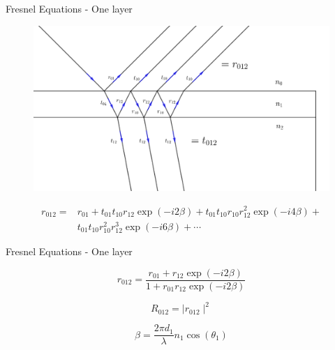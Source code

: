 \documentclass[10pt]{beamer}
\begin{document}
	\begin{frame}{Fresnel Equations - One layer}
	
	\begin{figure} 
		 \begin{center}
		   \includegraphics[width=\textwidth]{figreflre.png}
		 \end{center}
	\end{figure}
	\begin{align*}
	r_{012} = &r_{01} + t_{01}t_{10}r_{12}\exp(-i2\beta) + t_{01}t_{10}r_{10}r_{12}^2\exp(-i4\beta)+ \\ &t_{01}t_{10}r_{10}^2r_{12}^3\exp(-i6\beta)+ \cdots
	\end{align*} 
	
	\end{frame}
	
	\begin{frame}{Fresnel Equations - One layer}
	
	\begin{minipage}{0.47\textwidth}
	
		
	\begin{equation*}\label{eq:2layerreflect}
	r_{012}= \frac{r_{01}+r_{12}\exp(-i2\beta)}{1+r_{01}r_{12}\exp(-i2\beta)}
	\end{equation*}
	
	\begin{equation*}
	R_{012} = \mid r_{012} \mid ^2 
	\end{equation*}
	 
	\end{minipage}
	\begin{minipage}{0.5\textwidth}
	\begin{equation*}
	\beta=\frac{2\pi d_1}{\lambda} n_1\cos(\theta_1)
	\end{equation*}
	\end{minipage}	
	\end{frame}
\end{document}
